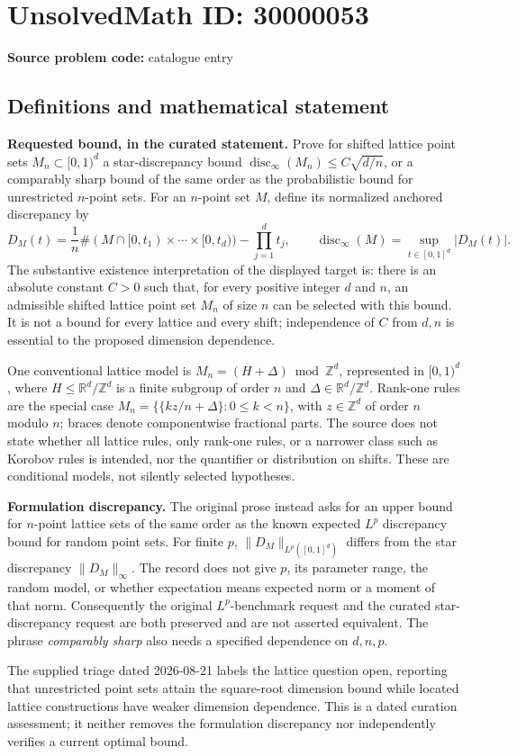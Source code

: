 \documentclass[11pt]{article}
\newcommand{\Z}{\mathbb{Z}}
\newcommand{\R}{\mathbb{R}}
\begin{document}
\section*{UnsolvedMath ID: 30000053}
\textbf{Source problem code:} catalogue entry
\subsection{Definitions and mathematical statement}
\textbf{Requested bound, in the curated statement.} Prove for shifted lattice point sets \(M_n\subset[0,1)^d\) a star-discrepancy bound \(\operatorname{disc}_\infty(M_n)\le C\sqrt{d/n}\), or a comparably sharp bound of the same order as the probabilistic bound for unrestricted \(n\)-point sets. For an \(n\)-point set \(M\), define its normalized anchored discrepancy by\[D_M(t)=\frac1n\#(M\cap[0,t_1)\times\cdots\times[0,t_d))-\prod_{j=1}^dt_j,\qquad \operatorname{disc}_\infty(M)=\sup_{t\in[0,1]^d}|D_M(t)|.\] The substantive existence interpretation of the displayed target is: there is an absolute constant \(C>0\) such that, for every positive integer \(d\) and \(n\), an admissible shifted lattice point set \(M_n\) of size \(n\) can be selected with this bound. It is not a bound for every lattice and every shift; independence of \(C\) from \(d,n\) is essential to the proposed dimension dependence.\par One conventional lattice model is \(M_n=(H+\Delta)\bmod\Z^d\), represented in \([0,1)^d\), where \(H\le\R^d/\Z^d\) is a finite subgroup of order \(n\) and \(\Delta\in\R^d/\Z^d\). Rank-one rules are the special case \(M_n=\{\{kz/n+\Delta\}:0\le k<n\}\), with \(z\in\Z^d\) of order \(n\) modulo \(n\); braces denote componentwise fractional parts. The source does not state whether all lattice rules, only rank-one rules, or a narrower class such as Korobov rules is intended, nor the quantifier or distribution on shifts. These are conditional models, not silently selected hypotheses.\par \textbf{Formulation discrepancy.} The original prose instead asks for an upper bound for \(n\)-point lattice sets of the same order as the known expected \(L^p\) discrepancy bound for random point sets. For finite \(p\), \(\|D_M\|_{L^p([0,1]^d)}\) differs from the star discrepancy \(\|D_M\|_\infty\). The record does not give \(p\), its parameter range, the random model, or whether expectation means expected norm or a moment of that norm. Consequently the original \(L^p\)-benchmark request and the curated star-discrepancy request are both preserved and are not asserted equivalent. The phrase \emph{comparably sharp} also needs a specified dependence on \(d,n,p\).\par The supplied triage dated 2026-08-21 labels the lattice question open, reporting that unrestricted point sets attain the square-root dimension bound while located lattice constructions have weaker dimension dependence. This is a dated curation assessment; it neither removes the formulation discrepancy nor independently verifies a current optimal bound.
\end{document}

